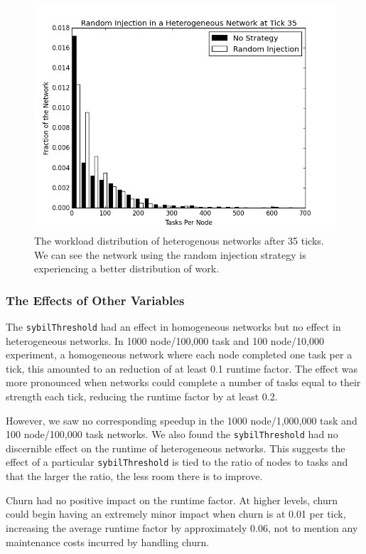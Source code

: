 \documentclass[11pt,letterpaper]{article}
\begin{document}
{	
	\begin{figure}
		\centering
		\includegraphics[width=0.7\linewidth]{figs/randomStableHistHetero35}
		\caption[Random injection in a Heterogenous Network]{The workload distribution of heterogenous networks after 35 ticks.  We can see the network using the random injection strategy is experiencing a better distribution of work.}
		\label{fig:randomStableHistHetero35}
	\end{figure}
	
	
	
	\subsubsection{The Effects of Other Variables}
	
	The \texttt{sybilThreshold} had an effect in homogeneous networks but no effect in heterogeneous networks.
	In 1000 node/100,000 task and 100 node/10,000 experiment, a homogeneous network where each node completed one task per a tick, this amounted to an reduction of at least 0.1 runtime factor.
	The effect was more pronounced when networks could complete a number of tasks equal to their strength each tick, reducing the runtime factor by at least 0.2.
	
	However, we saw no corresponding speedup in the 1000 node/1,000,000 task and 100 node/100,000 task networks.
	We also found the \texttt{sybilThreshold} had no discernible effect on the runtime of heterogeneous networks.
	This suggests the effect of a particular \texttt{sybilThreshold} is tied to the ratio of nodes to tasks and that the larger the ratio, the less room there is to improve.
	
	Churn had no positive impact on the runtime factor.
	At higher levels, churn could begin having an extremely minor impact when churn is at 0.01 per tick, increasing the average runtime factor by approximately 0.06, not to mention any maintenance costs incurred by handling churn.
	
}
\end{document}
